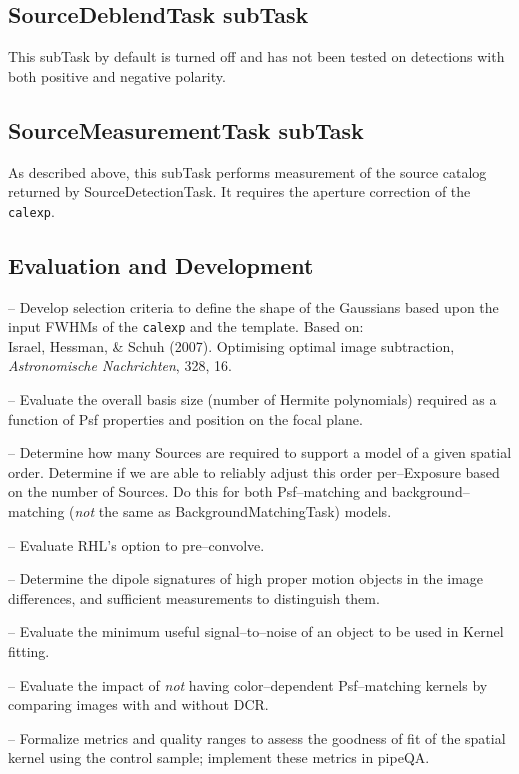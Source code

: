 \documentclass[prd, nofootinbib, floatfix, 11pt,tightenlines,times]{article}
\begin{document}
\subsection{SourceDeblendTask subTask}
This subTask by default is turned off and has not been tested on detections
with both positive and negative polarity.

\subsection{SourceMeasurementTask subTask}
As described above, this subTask performs measurement of the source
catalog returned by SourceDetectionTask.  It requires the aperture
correction of the {\tt calexp}.

\subsection{Evaluation and Development}

-- Develop selection criteria to define the shape of the Gaussians
based upon the input FWHMs of the {\tt calexp} and the template.
Based on: \\ {Israel}, {Hessman}, \& {Schuh} (2007).  Optimising
optimal image subtraction, {\it Astronomische Nachrichten}, 328, 16.

-- Evaluate the overall basis size (number of Hermite polynomials)
required as a function of Psf properties and position on the focal plane.

-- Determine how many Sources are required to support a model of a given
spatial order.  Determine if we are able to reliably adjust this order
per--Exposure based on the number of Sources.  Do this for both
Psf--matching and background--matching ({\it not} the same as
BackgroundMatchingTask) models.

-- Evaluate RHL's option to pre--convolve.

-- Determine the dipole signatures of high proper motion objects in
the image differences, and sufficient measurements to distinguish
them.

-- Evaluate the minimum useful signal--to--noise of an object to be
used in Kernel fitting.

-- Evaluate the impact of {\it not} having color--dependent
Psf--matching kernels by comparing images with and without DCR.

-- Formalize metrics and quality ranges to assess the goodness of fit
of the spatial kernel using the control sample; implement these
metrics in pipeQA.
\end{document}
